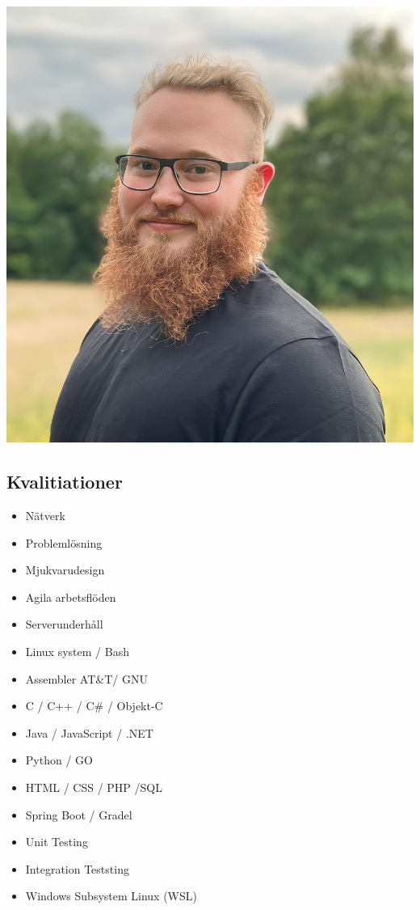 \documentclass{article}
\begin{document}
\begin{minipage}[t]{0.28\textwidth}
\begin{minipage}[t]{0.8\textwidth}
\vspace{-140pt} %
  \includegraphics[width=\linewidth]{../me-s.png}
  \label{fig:bild}
\end{minipage}
\vspace{-10pt} %
\subsection*{\textcolor{colorBlue}{Kvalitiationer}}
\begin{itemize}
  \item Nätverk
  \item Problemlösning
  \item Mjukvarudesign
  \item Agila arbetsflöden
  \item Serverunderhåll
  \item Linux system / Bash
  \item Assembler AT\&T/ GNU
  \item C / C++ / C\# / Objekt-C
  \item Java / JavaScript / .NET
  \item Python / GO
  \item HTML / CSS / PHP /SQL
  \item Spring Boot / Gradel
  \item Unit Testing
  \item Integration Teststing
  \item Windows Subsystem Linux (WSL)
\end{itemize}
\vspace{-10pt} %

\end{minipage}
\end{document}
